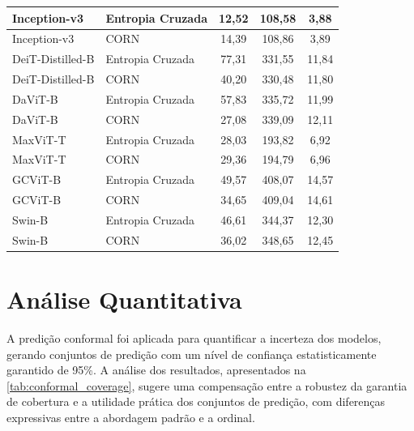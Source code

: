 \begin{table}
\begin{tabular}{|l|l|c|c|c|}
        \hline
        Inception-v3 & Entropia Cruzada & 12,52 & 108,58 & 3,88 \\
        \hline
        Inception-v3 & CORN & 14,39 & 108,86 & 3,89 \\
        \hline
        DeiT-Distilled-B & Entropia Cruzada & 77,31 & 331,55 & 11,84 \\
        \hline
        DeiT-Distilled-B & CORN & 40,20 & 330,48 & 11,80 \\
        \hline
        DaViT-B & Entropia Cruzada & 57,83 & 335,72 & 11,99 \\
        \hline
        DaViT-B & CORN & 27,08 & 339,09 & 12,11 \\
        \hline
        MaxViT-T & Entropia Cruzada & 28,03 & 193,82 & 6,92 \\
        \hline
        MaxViT-T & CORN & 29,36 & 194,79 & 6,96 \\
        \hline
        GCViT-B & Entropia Cruzada & 49,57 & 408,07 & 14,57 \\
        \hline
        GCViT-B & CORN & 34,65 & 409,04 & 14,61 \\
        \hline
        Swin-B & Entropia Cruzada & 46,61 & 344,37 & 12,30 \\
        \hline
        Swin-B & CORN & 36,02 & 348,65 & 12,45 \\
        \hline
    \end{tabular}
\end{table}

\section{Análise Quantitativa}

A predição conformal foi aplicada para quantificar a incerteza dos modelos, gerando conjuntos de predição com um nível de confiança estatisticamente garantido de 95\%. A análise dos resultados, apresentados na \autoref{tab:conformal_coverage}, sugere uma compensação entre a robustez da garantia de cobertura e a utilidade prática dos conjuntos de predição, com diferenças expressivas entre a abordagem padrão e a ordinal.

